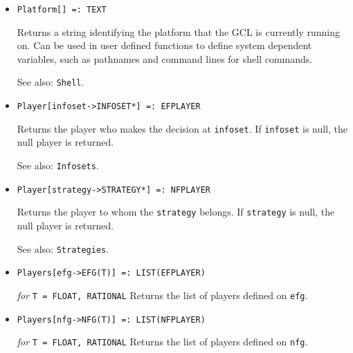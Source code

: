 \begin{itemize}
{\it for} {\tt T = FLOAT, RATIONAL}
\bd
Returns the payoff to \verb+player+ in a normal form game if all players
follow \verb+profile+.  It is an error if \verb+profile+ and \verb+player+
are not from the same normal form game.
\ed

\item{}
\protect \large \begin{verbatim}
Platform[] =: TEXT
\end{verbatim} \normalsize

\bd 
Returns a string identifying the platform that the GCL is
currently running on.  Can be used in user defined functions to define
system dependent variables, such as pathnames and command lines for
shell commands.  
\item [See also:] \verb+Shell+.
\ed

\item{}
\protect \large \begin{verbatim}
Player[infoset->INFOSET*] =: EFPLAYER
\end{verbatim}\normalsize

\bd
Returns the player who makes the decision at \verb+infoset+.
If \verb+infoset+ is null, the null player is returned.
\item [See also:] \verb+Infosets+.
\ed

\item{}
\protect \large \begin{verbatim}
Player[strategy->STRATEGY*] =: NFPLAYER
\end{verbatim}\normalsize

\bd
Returns the player to whom the \verb+strategy+ belongs.
If \verb+strategy+ is null, the null player is returned.
\item [See also:] \verb+Strategies+.
\ed

\item{}
\protect \large \begin{verbatim}
Players[efg->EFG(T)] =: LIST(EFPLAYER)
\end{verbatim} \normalsize

{\it for} {\tt T = FLOAT, RATIONAL}
\bd
Returns the list of players defined on \verb+efg+.
\ed

\item{}
\protect \large \begin{verbatim}
Players[nfg->NFG(T)] =: LIST(NFPLAYER)
\end{verbatim} \normalsize

{\it for} {\tt T = FLOAT, RATIONAL}
\bd
Returns the list of players defined on \verb+nfg+.
\ed


\end{itemize}

